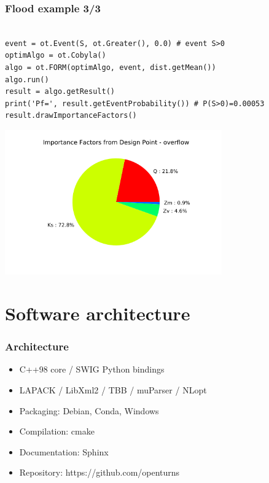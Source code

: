 \documentclass{beamer}
\begin{document}
\begin{frame}[containsverbatim]
\frametitle{Flood example 3/3}

\begin{adjustbox}{max width=0.8\linewidth, margin=0pt}
\begin{lstlisting}

event = ot.Event(S, ot.Greater(), 0.0) # event S>0
optimAlgo = ot.Cobyla()
algo = ot.FORM(optimAlgo, event, dist.getMean())
algo.run()
result = algo.getResult()
print('Pf=', result.getEventProbability()) # P(S>0)=0.00053
result.drawImportanceFactors()
\end{lstlisting}
\end{adjustbox}
\begin{center}
\includegraphics[width=0.7\textwidth]{figures/imp_fact}
\end{center}

\end{frame}


\section{Software architecture}

\begin{frame}[containsverbatim]
\frametitle{Architecture}

\begin{itemize}
\item C++98 core / SWIG Python bindings
\item LAPACK / LibXml2 / TBB / muParser / NLopt
\item Packaging: Debian, Conda, Windows
\item Compilation: cmake
\item Documentation: Sphinx
\item Repository: https://github.com/openturns
\end{itemize}

\end{frame}
\end{document}
